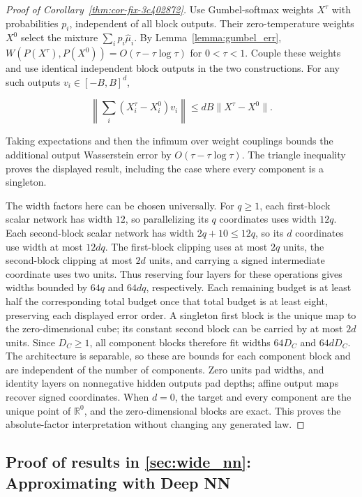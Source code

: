 \begin{proof}[Proof of Corollary~\ref{thm:cor-fix-3c402872}]
Use Gumbel-softmax weights $X^\tau$ with probabilities $p_i$, independent of all block outputs. Their zero-temperature weights $X^0$ select the mixture $\sum_i p_i\hat\mu_i$. By Lemma~\ref{lemma:gumbel_err}, $W(P(X^\tau),P(X^0))=O(\tau-\tau\log\tau)$ for $0<\tau<1$. Couple these weights and use identical independent block outputs in the two constructions. For any such outputs $v_i\in[-B,B]^d$,

\[
\left\|\sum_i(X_i^\tau-X_i^0)v_i\right\|\leqslant dB\|X^\tau-X^0\|.
\]

Taking expectations and then the infimum over weight couplings bounds the additional output Wasserstein error by $O(\tau-\tau\log\tau)$. The triangle inequality proves the displayed result, including the case where every component is a singleton.

The width factors here can be chosen universally. For $q\geqslant1$, each first-block scalar network has width $12$, so parallelizing its $q$ coordinates uses width $12q$. Each second-block scalar network has width $2q+10\leqslant12q$, so its $d$ coordinates use width at most $12dq$. The first-block clipping uses at most $2q$ units, the second-block clipping at most $2d$ units, and carrying a signed intermediate coordinate uses two units. Thus reserving four layers for these operations gives widths bounded by $64q$ and $64dq$, respectively. Each remaining budget is at least half the corresponding total budget once that total budget is at least eight, preserving each displayed error order. A singleton first block is the unique map to the zero-dimensional cube; its constant second block can be carried by at most $2d$ units. Since $D_C\geqslant1$, all component blocks therefore fit widths $64D_C$ and $64dD_C$. The architecture is separable, so these are bounds for each component block and are independent of the number of components. Zero units pad widths, and identity layers on nonnegative hidden outputs pad depths; affine output maps recover signed coordinates. When $d=0$, the target and every component are the unique point of $\mathbb R^0$, and the zero-dimensional blocks are exact. This proves the absolute-factor interpretation without changing any generated law.
\end{proof}




\subsection{Proof of results in \cref{sec:wide_nn}: Approximating with Deep NN}
 
